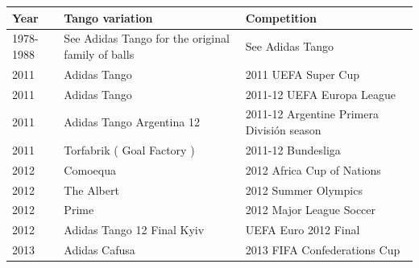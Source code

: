 \documentclass{article}
\begin{document}
\begin{tabular}{lll}
\toprule
Year & Tango variation & Competition \\
\midrule
1978-1988 & See Adidas Tango for the original family of balls & See Adidas Tango \\
2011 & Adidas Tango & 2011 UEFA Super Cup \\
2011 & Adidas Tango & 2011-12 UEFA Europa League \\
2011 & Adidas Tango Argentina 12 & 2011-12 Argentine Primera División season \\
2011 & Torfabrik ( Goal Factory ) & 2011-12 Bundesliga \\
2012 & Comoequa & 2012 Africa Cup of Nations \\
2012 & The Albert & 2012 Summer Olympics \\
2012 & Prime & 2012 Major League Soccer \\
2012 & Adidas Tango 12 Final Kyiv & UEFA Euro 2012 Final \\
2013 & Adidas Cafusa & 2013 FIFA Confederations Cup \\
\bottomrule
\end{tabular}
\end{document}
